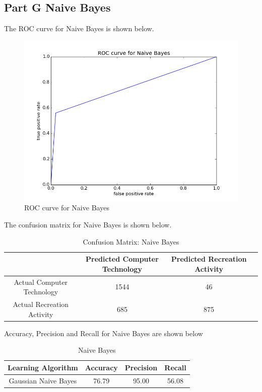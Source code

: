 \documentclass[11pt]{article}
\begin{document}
\newpage
\subsection{Part G Naive Bayes}

The ROC curve for Naive Bayes is shown below.

\begin{figure}[H]
	\centering
	\includegraphics[scale = 0.6]{ROC_NaiveBayes.png}
	\caption{ROC curve for Naive Bayes}
\end{figure}

The confusion matrix for Naive Bayes is shown below.

\begin{table}[H]
	\centering
	\begin{tabular}{|c|c|c|c|} \hline
		& Predicted Computer Technology & Predicted Recreation Activity \\ \hline
		Actual Computer Technology & 1544 & 46 \\
		Actual Recreation Activity & 685& 875  \\
		\hline
	\end{tabular}
	\caption{Confusion Matrix: Naive Bayes}
\end{table}

Accuracy, Precision and Recall for Naive Bayes are shown below

\begin{table}[H]
	\centering
	\begin{tabular}{|c|c|c|c|} \hline
		Learning Algorithm & Accuracy & Precision & Recall\\ \hline
		Gaussian Naive Bayes& 76.79 & 95.00 & 56.08 \\
		\hline
	\end{tabular}
	\caption{Naive Bayes}
\end{table}
\end{document}

